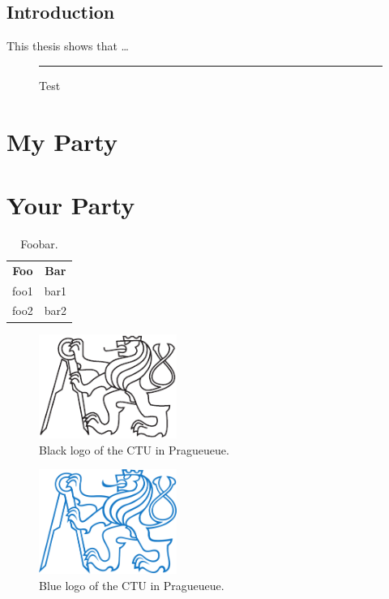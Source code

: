 \documentclass[twoside,11pt]{ctuthesis}
\theoremstyle{plain}
\theoremstyle{definition}
\theoremstyle{note}
\begin{document}
\maketitle

\chapter{Introduction}

This thesis shows that \ldots

\begin{figure}[!h]
\rule{3cm}{3cm}
\caption{Test}
\end{figure}

\part{My Party}






\part{Your Party}

\blindmathtrue

\blinddocument

\begin{table}
\begin{ctucolortab}
\begin{tabular}{cc}
\bfseries Foo & \bfseries Bar \\\Midrule
foo1 & bar1 \\
foo2 & bar2
\end{tabular}
\end{ctucolortab}
\caption{Foobar.}
\label{tab:foobar}
\end{table}

\begin{figure}
\includegraphics[width=0.4\textwidth]{ctu_logo_black}
\caption{Black logo of the CTU in Pragueueue.}
\end{figure}

\begin{figure}[!t]
\includegraphics[width=0.4\textwidth]{ctu_logo_blue}
\caption{Blue logo of the CTU in Pragueueue.}
\end{figure}
\end{document}

